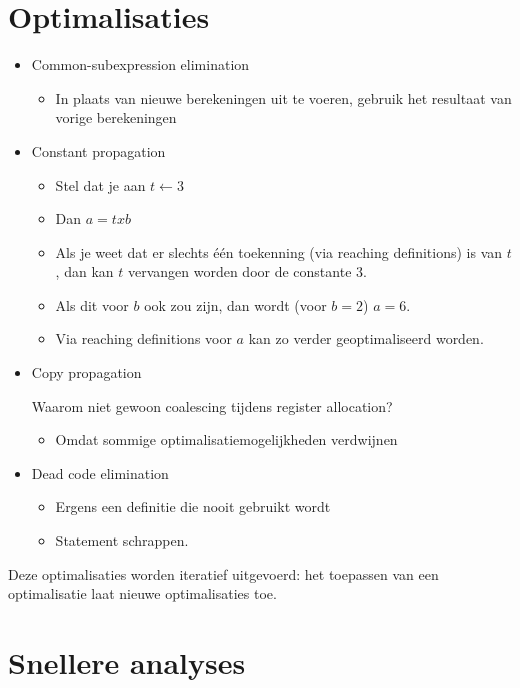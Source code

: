 \section{Optimalisaties}
\begin{itemize}
	\item Common-subexpression elimination
	\begin{itemize}
		\item In plaats van nieuwe berekeningen uit te voeren, gebruik het resultaat van vorige berekeningen
	\end{itemize}
	\item Constant propagation
	\begin{itemize}
		\item Stel dat je aan $t \leftarrow 3$
		\item Dan $a = t x b$
		\item Als je weet dat er slechts één toekenning (via reaching definitions) is van $t$, dan kan $t$ vervangen worden door de constante $3$.
		\item Als dit voor $b$ ook zou zijn, dan wordt (voor $b = 2$) $a = 6$.
		\item Via reaching definitions voor $a$ kan zo verder geoptimaliseerd worden.
		
	\end{itemize}
	\item Copy propagation
	\begin{itemize}
		\alert Waarom niet gewoon coalescing tijdens register allocation?
		\begin{itemize}
			\item Omdat sommige optimalisatiemogelijkheden  verdwijnen
		\end{itemize}
	\end{itemize}
	\item Dead code elimination
	\begin{itemize}
		\item Ergens een definitie die nooit gebruikt wordt
		\item Statement schrappen.
	\end{itemize}
\end{itemize}

Deze optimalisaties worden iteratief uitgevoerd: het toepassen van een optimalisatie laat nieuwe optimalisaties toe.

\section{Snellere analyses}

